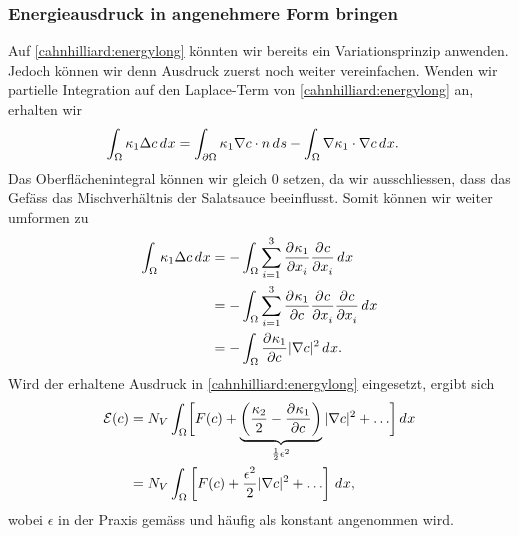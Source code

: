 \subsubsection{Energieausdruck in angenehmere Form bringen}
Auf \eqref{cahnhilliard:energylong} könnten wir bereits ein Variationsprinzip anwenden.
Jedoch können wir denn Ausdruck zuerst noch weiter vereinfachen.
Wenden wir partielle Integration auf den Laplace-Term von \eqref{cahnhilliard:energylong} an,
erhalten wir
\begin{align*}
\int_\Omega \kappa_1 \Delta c \,d^{}{x}
&=
\int_{\partial\Omega} \kappa_1 \nabla c \cdot n \,d^{}{s}
- \int_\Omega \nabla \kappa_1 \cdot \nabla c \,d^{}{x}
.
\end{align*}
Das Oberflächenintegral können wir gleich $0$ setzen,
da wir ausschliessen,
dass das Gefäss das Mischverhältnis der Salatsauce beeinflusst.
Somit können wir weiter umformen zu
\begin{align*}
\int_\Omega \kappa_1 \Delta c \,d^{}{x}
&=-\int_\Omega \sum_{i=1}^3 \frac{\partial^{} \kappa_1}{\partial x_i^{}} \frac{\partial^{} c}{\partial x_i^{}} \,d^{}{x}
\\
&=-\int_\Omega \sum_{i=1}^3 \frac{\partial^{} \kappa_1}{\partial c^{}} \frac{\partial^{} c}{\partial x_i^{}} \frac{\partial^{} c}{\partial x_i^{}} \,d^{}{x}
\\
&=
-\int_\Omega \frac{\partial^{} \kappa_1}{\partial c^{}} |\nabla c|^2 \,d^{}{x}
.
\end{align*}
Wird der erhaltene Ausdruck in \eqref{cahnhilliard:energylong} eingesetzt,
ergibt sich
\begin{align}
\mathcal{E}(c)
&=
N_V \int_\Omega \biggl[
  F(c) + \underbrace{\left( \frac{\kappa_2}{2} - \frac{\partial^{} \kappa_1}{\partial c^{}} \right)}_{\frac{1}{2}\epsilon^2} |\nabla c|^2  + \ldots
\biggr]\,d^{}{x}
\nonumber
\\
&=
N_V \int_\Omega \left[
  F(c) + \frac{\epsilon^2}{2} |\nabla c|^2  + \ldots
\right]\,d^{}{x}
,
\label{cahnhilliard:energy}
\end{align}
wobei $\epsilon$ in der Praxis gemäss \cite{cahnhilliard:freeenergy}
und \cite{cahnhilliard:deriv} häufig als konstant angenommen wird.
